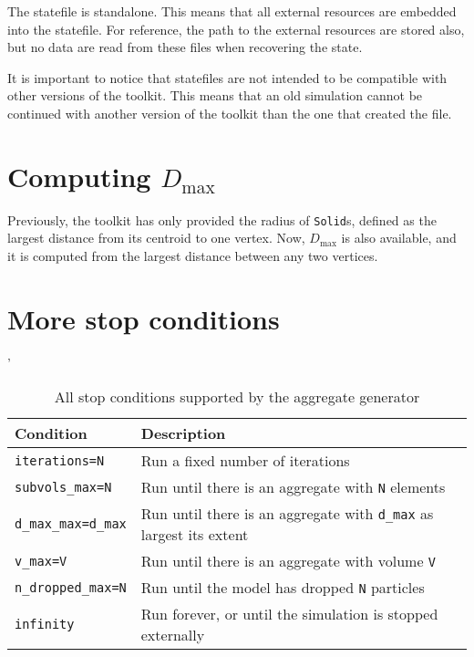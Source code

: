 \documentclass[a4paper,10pt]{scrartcl}
\begin{document}
The statefile is standalone. This means that all external resources are embedded into the statefile. For reference, the path to the external resources are stored also, but no data are read from these files when recovering the state.

It is important to notice that statefiles are not intended to be compatible with other versions of the toolkit. This means that an old simulation cannot be continued with another version of the toolkit than the one that created the file.

\section{Computing $D_\text{max}$}
Previously, the toolkit has only provided the radius of \texttt{Solid}s, defined as the largest distance from its centroid to one vertex. Now, $D_\text{max}$ is also available, and it is computed from the largest distance between any two vertices. 

\section{More stop conditions}
\begin{table}
 \caption{\label{stopcond}All stop conditions supported by the aggregate generator}'
 \begin{center}
 \begin{tabular}{p{}p{}}
 \hline
 \hline
  \textbf{Condition} & \textbf{Description}\\
  \hline
  \texttt{iterations=N} &  Run a fixed number of iterations \\
  \texttt{subvols\_max=N}              &  Run until there is an aggregate with \texttt{N} elements \\
  \texttt{d\_max\_max=d\_max}            &  Run until there is an aggregate with \texttt{d\_max} as largest its extent \\
  \texttt{v\_max=V}                     & Run until there is an aggregate with volume \texttt{V} \\
  \texttt{n\_dropped\_max=N}           & Run until the model has dropped \texttt{N} particles \\
  \texttt{infinity}                    & Run forever, or until the simulation is stopped externally \\
  \hline
  \hline
 \end{tabular}
 \end{center}
\end{table}
\end{document}
